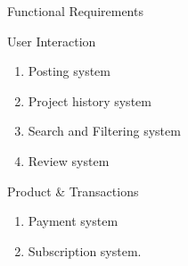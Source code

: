 \documentclass[aspectratio=169]{beamer}
\begin{document}
\begin{frame}{Functional Requirements}
    \begin{block}{User Interaction}
        \begin{enumerate}
            \item Posting system
            \item Project history system
            \item Search and Filtering system
            \item Review system
        \end{enumerate}
    \end{block}
    \begin{exampleblock}{Product \& Transactions}
        \begin{enumerate}
            \item Payment system
            \item Subscription system.
        \end{enumerate}
    \end{exampleblock}
\end{frame}
\end{document}
